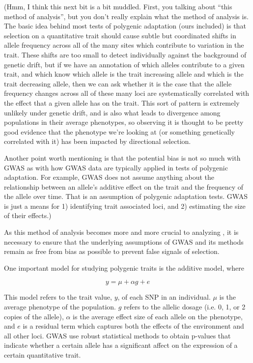 \documentclass[a4paper,10pt]{article}
\newcommand{\jb}[1]{{\color{blue} (#1)} }
\begin{document}
\jb{Hmm, I think this next bit is a bit muddled. First, you talking about ``this method of analysis'',
  but you don't really explain what the method of analysis is. The basic idea behind most tests of polygenic adaptation
  (ours included) is that selection on a quantitative trait should cause subtle but coordinated shifts in allele frequency
  across all of the many sites which contribute to variation in the trait. These shifts are too small to detect individually
  against the background of genetic drift, but if we have an annotation of which alleles contribute to a given trait,
  and which know which allele is the trait increasing allele and which is the trait decreasing allele, then we can ask whether
  it is the case that the allele frequency changes across all of these many loci are systematically correlated with the effect
  that a given allele has on the trait. This sort of pattern is extremely unlikely under genetic drift, and is also what leads
  to divergence among populations in their average phenotypes, so observing it is thought to be pretty good evidence that the
  phenotype we're looking at (or something genetically correlated with it) has been impacted by directional selection.

  Another point worth mentioning is that the potential bias is not so much with GWAS as with how GWAS data are typically
  applied in tests of polygenic adaptation. For example, GWAS does not assume anything about the relationship between
  an allele's additive effect on the trait and the frequency of the allele over time. That is an assumption of polygenic adaptation
  tests. GWAS is just a means for 1) identifying trait associated loci, and 2) estimating the size of their effects.}

As this method of
analysis becomes more and more crucial to analyzing , it is necessary to ensure that the underlying
assumptions of GWAS and its methods remain as free from bias as
possible to prevent false signals of selection. 

One important model for studying polygenic traits is the additive model, where

\begin{equation}
  y = \mu + \alpha g + e
\end{equation}

This model refers to the trait value, $y$, of each SNP in an
individual. $\mu$ is the average phenotype of the population. $g$ refers to the
allelic dosage (i.e. 0, 1, or 2 copies of the allele), $\alpha$ is the average effect size
of each allele on the phenotype, and $e$ is a residual term which captures both the
effects of the environment and all other loci. GWAS use robust statistical methods
to obtain p-values that indicate whether a certain allele has a
significant affect on the expression of a certain quantitative
trait.
\end{document}
